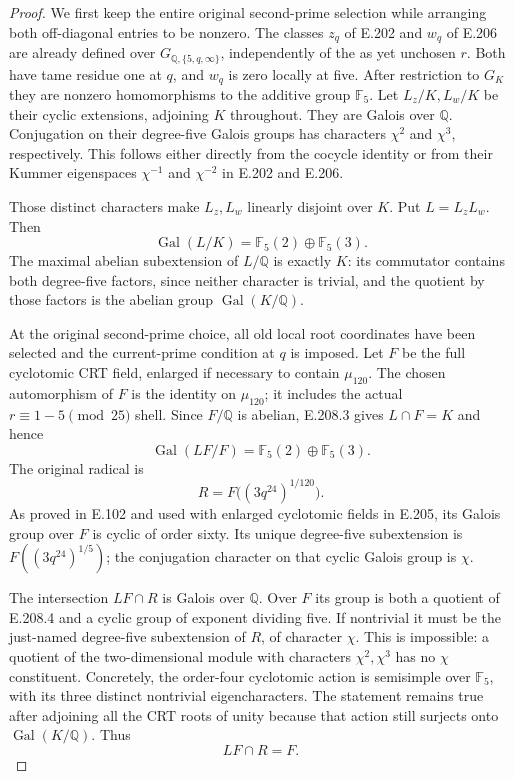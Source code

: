 \begin{proof}
We first keep the entire original second-prime selection
while arranging both off-diagonal entries to be nonzero.
The classes $z_q$ of E.202 and $w_q$ of E.206 are already
defined over $G_{\mathbb Q,\{5,q,\infty\}}$, independently
of the as yet unchosen $r$. Both have tame residue one
at $q$, and $w_q$ is zero locally at five.
After restriction to $G_K$ they are nonzero homomorphisms
to the additive group $\mathbb F_5$.
Let $L_z/K,L_w/K$ be their cyclic extensions, adjoining
$K$ throughout. They are Galois over $\mathbb Q$.
Conjugation on their degree-five Galois groups has
characters $\chi^2$ and $\chi^3$, respectively.
This follows either directly from the cocycle identity
or from their Kummer eigenspaces $\chi^{-1}$ and
$\chi^{-2}$ in E.202 and E.206.

Those distinct characters make $L_z,L_w$ linearly
disjoint over $K$. Put $L=L_zL_w$.
Then
\[
 \operatorname{Gal}(L/K)=\mathbb F_5(2)\oplus\mathbb F_5(3).
 \tag{E.208.3}
\]
The maximal abelian subextension of $L/\mathbb Q$ is
exactly $K$: its commutator contains both degree-five
factors, since neither character is trivial, and the
quotient by those factors is the abelian group
$\operatorname{Gal}(K/\mathbb Q)$.

At the original second-prime choice, all old local root
coordinates have been selected and the current-prime
condition at $q$ is imposed. Let $F$ be the full
cyclotomic CRT field, enlarged if necessary to contain
$\mu_{120}$. The chosen automorphism of $F$ is the
identity on $\mu_{120}$; it includes the actual
$r\equiv1-5\pmod{25}$ shell. Since $F/\mathbb Q$
is abelian, E.208.3 gives $L\cap F=K$ and hence
\[
 \operatorname{Gal}(LF/F)
     =\mathbb F_5(2)\oplus\mathbb F_5(3).                         \tag{E.208.4}
\]
The original radical is
\[
                  R=F\bigl((3q^{24})^{1/120}\bigr).
\]
As proved in E.102 and used with enlarged cyclotomic
fields in E.205, its Galois group over $F$ is cyclic
of order sixty. Its unique degree-five subextension
is $F((3q^{24})^{1/5})$; the conjugation character on
that cyclic Galois group is $\chi$.

The intersection $LF\cap R$ is Galois over
$\mathbb Q$. Over $F$ its group is both a quotient
of E.208.4 and a cyclic group of exponent dividing
five. If nontrivial it must be the just-named
degree-five subextension of $R$, of character $\chi$.
This is impossible: a quotient of the two-dimensional
module with characters $\chi^2,\chi^3$ has no
$\chi$ constituent. Concretely, the order-four
cyclotomic action is semisimple over $\mathbb F_5$,
with its three distinct nontrivial eigencharacters.
The statement remains true after adjoining all the
CRT roots of unity because that action still surjects
onto $\operatorname{Gal}(K/\mathbb Q)$.
Thus
\[
                              LF\cap R=F.                       \tag{E.208.5}
\]


\end{proof}
